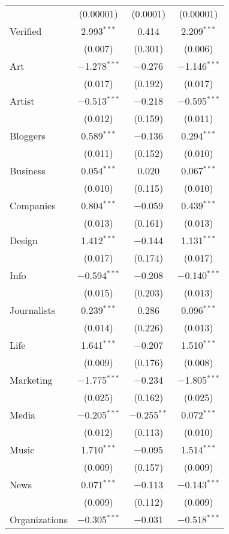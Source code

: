 \begin{table}[!htbp]
\begin{tabular}{@{\extracolsep{5pt}}lccc}
  & (0.00001) & (0.0001) & (0.00001) \\ 
  Verified & 2.993$^{***}$ & 0.414 & 2.209$^{***}$ \\ 
  & (0.007) & (0.301) & (0.006) \\ 
  Art & $-$1.278$^{***}$ & $-$0.276 & $-$1.146$^{***}$ \\ 
  & (0.017) & (0.192) & (0.017) \\ 
  Artist & $-$0.513$^{***}$ & $-$0.218 & $-$0.595$^{***}$ \\ 
  & (0.012) & (0.159) & (0.011) \\ 
  Bloggers & 0.589$^{***}$ & $-$0.136 & 0.294$^{***}$ \\ 
  & (0.011) & (0.152) & (0.010) \\ 
  Business & 0.054$^{***}$ & 0.020 & 0.067$^{***}$ \\ 
  & (0.010) & (0.115) & (0.010) \\ 
  Companies & 0.804$^{***}$ & $-$0.059 & 0.439$^{***}$ \\ 
  & (0.013) & (0.161) & (0.013) \\ 
  Design & 1.412$^{***}$ & $-$0.144 & 1.131$^{***}$ \\ 
  & (0.017) & (0.174) & (0.017) \\ 
  Info & $-$0.594$^{***}$ & $-$0.208 & $-$0.140$^{***}$ \\ 
  & (0.015) & (0.203) & (0.013) \\ 
  Journalists & 0.239$^{***}$ & 0.286 & 0.096$^{***}$ \\ 
  & (0.014) & (0.226) & (0.013) \\ 
  Life & 1.641$^{***}$ & $-$0.207 & 1.510$^{***}$ \\ 
  & (0.009) & (0.176) & (0.008) \\ 
  Marketing & $-$1.775$^{***}$ & $-$0.234 & $-$1.805$^{***}$ \\ 
  & (0.025) & (0.162) & (0.025) \\ 
  Media & $-$0.205$^{***}$ & $-$0.255$^{**}$ & 0.072$^{***}$ \\ 
  & (0.012) & (0.113) & (0.010) \\ 
  Music & 1.710$^{***}$ & $-$0.095 & 1.514$^{***}$ \\ 
  & (0.009) & (0.157) & (0.009) \\ 
  News & 0.071$^{***}$ & $-$0.113 & $-$0.143$^{***}$ \\ 
  & (0.009) & (0.112) & (0.009) \\ 
  Organizations & $-$0.305$^{***}$ & $-$0.031 & $-$0.518$^{***}$ \\ 

\end{tabular}
\end{table}
